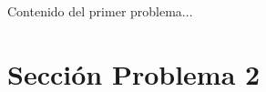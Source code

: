 \documentclass{IEEEcsmag}
\begin{document}
\newpage
Contenido del primer problema...


















































































































\newpage


\section{Sección Problema 2}
\end{document}
